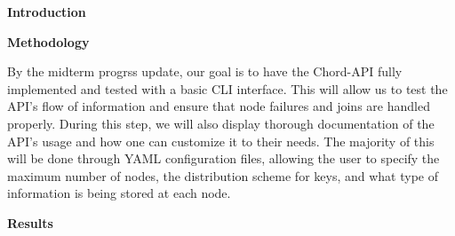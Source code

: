 \begin{large}
    \noindent\textbf{Introduction}
\end{large}

\vspace{5pt}

\begin{large}
    \noindent\textbf{Methodology}
\end{large}

By the midterm progrss update, our goal is to have the Chord-API fully implemented and tested with a basic CLI interface.
This will allow us to test the API's flow of information and ensure that node failures and joins are handled properly.
During this step, we will also display thorough documentation of the API's usage and how one can customize it to their needs.
The majority of this will be done through YAML configuration files, allowing the user to specify the maximum number of nodes, the distribution scheme for keys, and what type of information is being stored at each node.

\vspace{5pt}

\begin{large}
    \noindent\textbf{Results}
\end{large}

\pagebreak